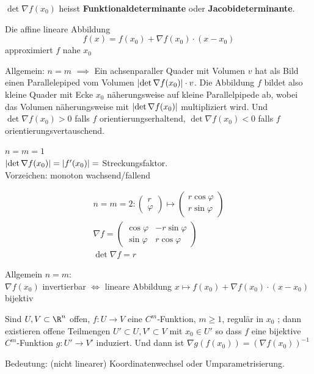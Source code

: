 \begin{def*}[note = Funktionaldeterminante , index = Funktional Jacobi determinante , indexformat = {3!1-~ 3!2-~ 1.3 2.3}]
	$\det \nabla f(x_0)$ heisst \textbf{Funktionaldeterminante} oder \textbf{Jacobideterminante}.
\end{def*}
Die affine lineare Abbildung
\[ f(x) = f(x_0) + \nabla f(x_0) \cdot (x-x_0) \]
approximiert $f$ nahe $x_0$

Allgemein: $n=m$ $\implies$ Ein achsenparaller Quader mit Volumen $v$ hat als Bild einen Parallelepiped vom Volumen $\abs{\det \nabla f(x_0)} \cdot v$. Die Abbildung $f$ bildet also kleine Quader mit Ecke $x_0$ näherungsweise auf kleine Parallelpipede ab, wobei das Volumen näherungsweise mit $\abs{\det \nabla f(x_0)}$ multipliziert wird. Und $\det \nabla f(x_0) > 0$ falls $f$ orientierungserhaltend, $\det \nabla f(x_0) < 0$ falls $f$ orientierungsvertauschend.

\begin{bsp*}
	$n = m = 1$ \\
	$\abs{\det \nabla f(x_0)} = \abs{f'(x_0)} = $ Streckungsfaktor. \\
	Vorzeichen: monoton wachsend/fallend
\end{bsp*}
\begin{bsp*}
	\begin{gather*}
		n = m = 2 : \begin{pmatrix} r \\ \varphi \end{pmatrix} \mapsto \begin{pmatrix} r \cos \varphi \\ r \sin \varphi \end{pmatrix} \\
		\nabla f = \begin{pmatrix} \cos \varphi & -r \sin \varphi \\ \sin \varphi & r \cos \varphi \end{pmatrix} \\
		\det \nabla f = r
	\end{gather*}
\end{bsp*}
Allgemein $n=m$: \\
$\nabla f(x_0)$ invertierbar $\iff$ lineare Abbildung $x \mapsto f(x_0) + \nabla f(x_0) \cdot (x-x_0)$ bijektiv

\begin{satz*}[note = Satz über inverse Funktionen , indexformat = {1!~234}]
	Sind $U,V \subset \R^n$ offen, $f: U \rightarrow V$ eine $C^m$-Funktion, $m \geq 1$, regulär in $x_0$ ; dann existieren offene Teilmengen $U' \subset U , V' \subset V$ mit $x_0 \in U'$ so dass $f$ eine bijektive $C^m$-Funktion $g: U' \rightarrow V'$ induziert. Und dann ist $\nabla g(f(x_0)) = (\nabla f(x_0))^{-1}$
\end{satz*}
Bedeutung: (nicht linearer) Koordinatenwechsel oder Umparametrisierung.
